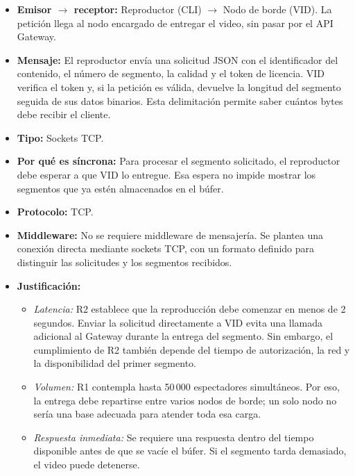 \begin{itemize}
    \item \textbf{Emisor $\rightarrow$ receptor:}
    Reproductor (CLI) $\rightarrow$ Nodo de borde (VID). La petición llega al nodo encargado de entregar el video, sin pasar por el API Gateway.

    \item \textbf{Mensaje:}
    El reproductor envía una solicitud JSON con el identificador del contenido, el número de segmento, la calidad y el token de licencia. VID verifica el token y, si la petición es válida, devuelve la longitud del segmento seguida de sus datos binarios. Esta delimitación permite saber cuántos bytes debe recibir el cliente.

    \item \textbf{Tipo:} Sockets TCP.

    \item \textbf{Por qué es síncrona:}
    Para procesar el segmento solicitado, el reproductor debe esperar a que VID lo entregue. Esa espera no impide mostrar los segmentos que ya estén almacenados en el búfer.

    \item \textbf{Protocolo:} TCP.

    \item \textbf{Middleware:}
    No se requiere middleware de mensajería. Se plantea una conexión directa mediante sockets TCP, con un formato definido para distinguir las solicitudes y los segmentos recibidos.

    \item \textbf{Justificación:}
    \begin{itemize}
        \item \textit{Latencia:}
        R2 establece que la reproducción debe comenzar en menos de 2 segundos. Enviar la solicitud directamente a VID evita una llamada adicional al Gateway durante la entrega del segmento. Sin embargo, el cumplimiento de R2 también depende del tiempo de autorización, la red y la disponibilidad del primer segmento.

        \item \textit{Volumen:}
        R1 contempla hasta 50\,000 espectadores simultáneos. Por eso, la entrega debe repartirse entre varios nodos de borde; un solo nodo no sería una base adecuada para atender toda esa carga.

        \item \textit{Respuesta inmediata:}
        Se requiere una respuesta dentro del tiempo disponible antes de que se vacíe el búfer. Si el segmento tarda demasiado, el video puede detenerse.


\end{itemize}
\end{itemize}
